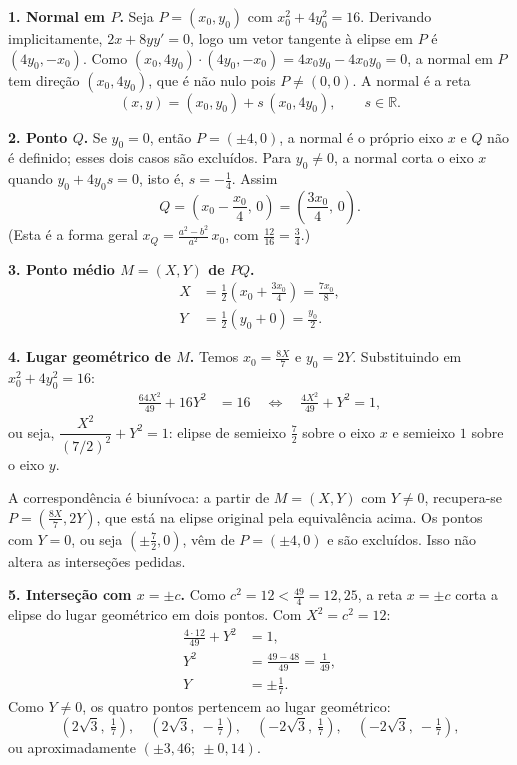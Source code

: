 \documentclass{article}%
\begin{document}
\textbf{1. Normal em $P$.} Seja $P=(x_0,y_0)$ com $x_0^2+4y_0^2=16$. Derivando implicitamente, $2x+8yy'=0$, logo um vetor tangente à elipse em $P$ é $(4y_0,-x_0)$. Como $(x_0,4y_0)\cdot(4y_0,-x_0)=4x_0y_0-4x_0y_0=0$, a normal em $P$ tem direção $(x_0,4y_0)$, que é não nulo pois $P\neq(0,0)$. A normal é a reta
$$(x,y)=(x_0,y_0)+s\,(x_0,4y_0),\qquad s\in\mathbb{R}.$$

\textbf{2. Ponto $Q$.} Se $y_0=0$, então $P=(\pm 4,0)$, a normal é o próprio eixo $x$ e $Q$ não é definido; esses dois casos são excluídos. Para $y_0\neq 0$, a normal corta o eixo $x$ quando $y_0+4y_0s=0$, isto é, $s=-\frac14$. Assim
$$Q=\left(x_0-\frac{x_0}{4},\,0\right)=\left(\frac{3x_0}{4},\,0\right).$$
(Esta é a forma geral $x_Q=\frac{a^2-b^2}{a^2}\,x_0$, com $\frac{12}{16}=\frac34$.)

\textbf{3. Ponto médio $M=(X,Y)$ de $PQ$.}
\begin{align*}
X&=\frac{1}{2}\left(x_0+\frac{3x_0}{4}\right)=\frac{7x_0}{8},\\
Y&=\frac{1}{2}\left(y_0+0\right)=\frac{y_0}{2}.
\end{align*}

\textbf{4. Lugar geométrico de $M$.} Temos $x_0=\frac{8X}{7}$ e $y_0=2Y$. Substituindo em $x_0^2+4y_0^2=16$:
\begin{align*}
\frac{64X^2}{49}+16Y^2&=16 \quad\Longleftrightarrow\quad \frac{4X^2}{49}+Y^2=1,
\end{align*}
ou seja, $\dfrac{X^2}{(7/2)^2}+Y^2=1$: elipse de semieixo $\frac72$ sobre o eixo $x$ e semieixo $1$ sobre o eixo $y$.

A correspondência é biunívoca: a partir de $M=(X,Y)$ com $Y\neq 0$, recupera-se $P=\left(\frac{8X}{7},2Y\right)$, que está na elipse original pela equivalência acima. Os pontos com $Y=0$, ou seja $\left(\pm\frac72,0\right)$, vêm de $P=(\pm4,0)$ e são excluídos. Isso não altera as interseções pedidas.

\textbf{5. Interseção com $x=\pm c$.} Como $c^2=12<\frac{49}{4}=12{,}25$, a reta $x=\pm c$ corta a elipse do lugar geométrico em dois pontos. Com $X^2=c^2=12$:
\begin{align*}
\frac{4\cdot 12}{49}+Y^2&=1,\\
Y^2&=\frac{49-48}{49}=\frac{1}{49},\\
Y&=\pm\frac{1}{7}.
\end{align*}
Como $Y\neq 0$, os quatro pontos pertencem ao lugar geométrico:
$$\left(2\sqrt{3},\ \tfrac17\right),\quad \left(2\sqrt{3},\ -\tfrac17\right),\quad \left(-2\sqrt{3},\ \tfrac17\right),\quad \left(-2\sqrt{3},\ -\tfrac17\right),$$
ou aproximadamente $(\pm 3{,}46;\ \pm 0{,}14)$.
\end{document}
